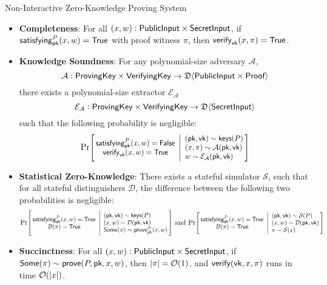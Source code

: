 \begin{definitiontoc}{Non-Interactive Zero-Knowledge Proving System}
    \begin{itemize}
        \item \textbf{Completeness}: For all $(x, w) : {\textsf{PublicInput}} \times {\textsf{SecretInput}}$, if ${\textsf{satisfying}}^P_{\textsf{pk}}(x, w) = {\textsf{True}}$ with proof witness $\pi$, then ${\textsf{verify}}_{\textsf{vk}}(x, \pi) = {\textsf{True}}$.
        \item \textbf{Knowledge Soundness}: For any polynomial-size adversary $\mathcal{A}$,
            \[\mathcal{A} : {\textsf{ProvingKey}} \times {\textsf{VerifyingKey}} \to \mathfrak{D}\langle{{\textsf{PublicInput}}\times {\textsf{Proof}}}\rangle\]
             there exists a polynomial-size extractor $\mathcal{E}_\mathcal{A}$
            \[\mathcal{E}_\mathcal{A} : {\textsf{ProvingKey}} \times {\textsf{VerifyingKey}} \to \mathfrak{D}\langle{{\textsf{SecretInput}}}\rangle\]
            such that the following probability is negligible:
            \[
                \Prob{
                    \satisfying^P_\pk(x, w) = \False \\
                    \verify_\vk(x, w) = \True
                }{
                    (\pk, \vk) \sim \keys(P) \\
                    (x, \pi) \sim \mathcal{A}(\pk, \vk) \\
                    w \sim \mathcal{E}_\mathcal{A}(\pk, \vk)
                }
            \]
        \item \textbf{Statistical Zero-Knowledge}: There exists a stateful simulator $\mathcal{S}$, such that for all stateful distinguishers $\mathcal{D}$, the difference between the following two probabilities is negligible:
            \[
                \Prob{
                    \satisfying^P_\pk(x, w) = \True \\
                    \mathcal{D}(\pi) = \True
                }{
                    (\pk, \vk) \sim \keys(P) \\
                    (x, w) \sim \mathcal{D}(\pk, \vk) \\
                    \Some(\pi) \sim \prove^P_\pk(x, w)
                }
                \,\,\text{and}\,\,
                \Prob{
                    \satisfying^P_\pk(x, w) = \True \\
                    \mathcal{D}(\pi) = \True
                }{
                    (\pk, \vk) \sim \mathcal{S}(P) \\
                    (x, w) \sim \mathcal{D}(\pk, \vk) \\
                    \pi \sim \mathcal{S}(x)
                }
            \]
        \item \textbf{Succinctness}: For all $(x, w) : {\textsf{PublicInput}} \times {\textsf{SecretInput}}$, if ${\textsf{Some}}(\pi) \sim {\textsf{prove}}(P, {\textsf{pk}}, x, w)$, then $\left|\pi\right| = \mathcal{O}(1)$, and ${\textsf{verify}}({\textsf{vk}}, x, \pi)$ runs in time $\mathcal{O}(\left|x\right|)$.
    \end{itemize}
\end{definitiontoc}

